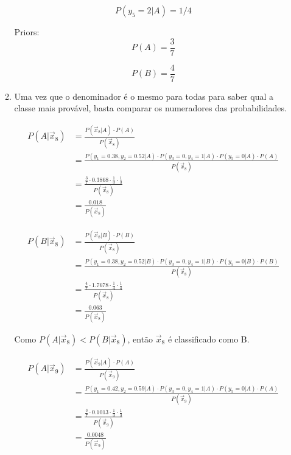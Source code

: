 \documentclass[a4paper,12pt]{article} %
\begin{document}
\begin{enumerate}
\begin{enumerate}
\begin{equation*}
    P(y_5=2|A) = 1/4
\end{equation*}

Priors:
\begin{equation*}    
    P(A) = \frac{3}{7}
\end{equation*}

\begin{equation*}    
    P(B) = \frac{4}{7}
\end{equation*}



\item Uma vez que o denominador é o mesmo para todas para saber qual a classe mais provável, basta comparar os numeradores das probabilidades.

\begin{equation*}
    \begin{aligned}
        P(A|\vec{x}_8) & = \frac{P(\vec{x}_8|A) \cdot P(A)}{P(\vec{x}_8)} \\
                       & = \frac{P(y_1=0.38,y_2=0.52|A) \cdot P(y_3=0,y_4=1|A) \cdot P(y_5=0|A) \cdot P(A)}{P(\vec{x}_8)} \\
                       & = \frac{\frac{3}{7} \cdot 0.3868 \cdot \frac{1}{3} \cdot \frac{1}{3}}{P(\vec{x}_8)} \\
                       & = \frac{0.018}{P(\vec{x}_8)}
    \end{aligned}
\end{equation*}
    
\begin{equation*}
    \begin{aligned}
        P(B|\vec{x}_8) & = \frac{P(\vec{x}_8|B) \cdot P(B)}{P(\vec{x}_8)} \\
                       & = \frac{P(y_1=0.38,y_2=0.52|B) \cdot P(y_3=0,y_4=1|B) \cdot P(y_5=0|B) \cdot P(B)}{P(\vec{x}_8)} \\
                       & = \frac{\frac{4}{7} \cdot 1.7678 \cdot \frac{1}{4} \cdot \frac{1}{4}}{P(\vec{x}_8)} \\
                       & = \frac{0.063}{P(\vec{x}_8)}
    \end{aligned}
\end{equation*}

Como $P(A|\vec{x}_8) < P(B|\vec{x}_8)$, então $\vec{x}_8$ é classificado como B.

\begin{equation*}
    \begin{aligned}
        P(A|\vec{x}_9) & = \frac{P(\vec{x}_9|A) \cdot P(A)}{P(\vec{x}_9)} \\
                       & = \frac{P(y_1=0.42,y_2=0.59|A) \cdot P(y_3=0,y_4=1|A) \cdot P(y_5=0|A) \cdot P(A)}{P(\vec{x}_9)} \\
                       & = \frac{\frac{3}{7} \cdot 0.1013 \cdot \frac{1}{3} \cdot \frac{1}{3}}{P(\vec{x}_9)} \\
                       & = \frac{0.0048}{P(\vec{x}_9)}
    \end{aligned}
\end{equation*}
    

\end{enumerate}
\end{enumerate}
\end{document}

